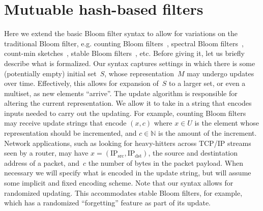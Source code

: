 \section{Mutuable hash-based filters}
Here we extend the basic Bloom filter syntax to allow for variations on the traditional Bloom filter, e.g. counting Bloom filters~\cite{xxx}, spectral Bloom filters~\cite{xxx}, count-min sketches~\cite{xxx}, stable Bloom filters~\cite{xxx}, etc.   Before giving it, let us briefly describe what is formalized.  Our syntax captures settings in which there is some (potentially empty) initial set~$S$, whose representation~$M$ may undergo updates over time.  Effectively, this allows for expansion of~$S$ to a larger set, or even a multiset, as new elements ``arrive''.    The update algorithm is responsible for altering the current representation.  We allow it to take in a string that encodes inputs needed to carry out the updating.  For example, counting Bloom filters may receive update strings that encode $(x,c)$ where $x \in U$ is the element whose representation should be incremented, and $c \in \mathbb{N}$ is the amount of the increment.  Network applications, such as looking for heavy-hitters across TCP/IP streams seen by a router, may have $x = (\mathrm{IP_{src}},\mathrm{IP_{dst}})$, the source and destintation address of a packet, and~$c$ the number of bytes in the packet payload.  When necessary we will specify what is encoded in the update string, but will assume some implicit and fixed encoding scheme.  Note that our syntax allows for randomized updating.  This accommodates stable Bloom filters, for example, which has a randomized ``forgetting'' feature as part of its update.

